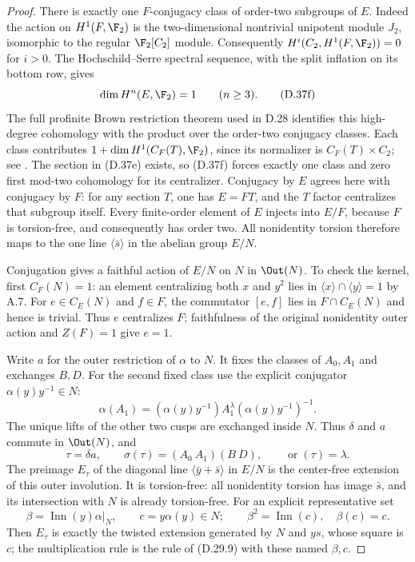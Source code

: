 \begin{proof}
There is exactly one $F$-conjugacy class of order-two subgroups
of $E$.  Indeed the action on $H^1(F,\F_2)$ is the two-dimensional
nontrivial unipotent module $J_2$, isomorphic to the regular
$\F_2[C_2]$ module.  Consequently
$H^i(C_2,H^1(F,\F_2))=0$ for $i>0$.
The Hochschild--Serre spectral sequence, with the split
inflation on its bottom row, gives
\[
                 \dim H^n(E,\F_2)=1\qquad(n\geq3).
                                                        \tag{D.37f}
\]
The full profinite Brown restriction theorem used in D.28
identifies this high-degree cohomology with the product over
the order-two conjugacy classes.  Each class contributes
$1+\dim H^1(C_F(T),\F_2)$, since its normalizer is
$C_F(T)\times C_2$; see
\cite[Theorem 2 and \S1.1]{A-KochloukovaZalesskii2007}.
The section in (D.37e) exists, so (D.37f) forces exactly one
class and zero first mod-two cohomology for its centralizer.
Conjugacy by $E$ agrees here with conjugacy by $F$: for any
section $T$, one has $E=FT$, and the $T$ factor centralizes
that subgroup itself.
Every finite-order element of $E$ injects into $E/F$,
because $F$ is torsion-free, and consequently has order two.
All nonidentity torsion therefore maps to the one line
$\langle\bar s\rangle$ in the abelian group $E/N$.

Conjugation gives a faithful action of $E/N$ on $N$ in
$\Out(N)$.  To check the kernel, first
$C_F(N)=1$: an element centralizing both $x$ and $y^2$
lies in $\langle x\rangle\cap\langle y\rangle=1$ by A.7.
For $e\in C_E(N)$ and $f\in F$, the commutator $[e,f]$
lies in $F\cap C_E(N)$ and hence is trivial.  Thus $e$
centralizes $F$; faithfulness of the original nonidentity
outer action and $Z(F)=1$ give $e=1$.

Write $a$ for the outer restriction of $\alpha$ to $N$.
It fixes the classes of $A_0,A_1$ and exchanges $B,D$.
For the second fixed class use the explicit conjugator
$\alpha(y)y^{-1}\in N$:
\[
 \alpha(A_1)
  =(\alpha(y)y^{-1}) A_1^\lambda
                         (\alpha(y)y^{-1})^{-1}.
                                                        \tag{D.37g}
\]
The unique lifts of the other two cusps are exchanged inside
$N$.  Thus $\delta$ and $a$ commute in $\Out(N)$, and
\[
 \tau=\delta a,\qquad
 \sigma(\tau)=(A_0\ A_1)(B\ D),\qquad
 \operatorname{or}(\tau)=\lambda.
                                                        \tag{D.37h}
\]
The preimage $E_\tau$ of the diagonal line
$\langle\bar y+\bar s\rangle$ in $E/N$ is the center-free
extension of this outer involution.  It is torsion-free:
all nonidentity torsion has image $\bar s$, and its
intersection with $N$ is already torsion-free.
For an explicit representative set
\[
 \beta=\operatorname{Inn}(y)\alpha|_N,\qquad
 c=y\alpha(y)\in N;\qquad
 \beta^2=\operatorname{Inn}(c),\quad \beta(c)=c.
                                                        \tag{D.37i}
\]
Then $E_\tau$ is exactly the twisted extension generated by
$N$ and $ys$, whose square is $c$; the multiplication rule
is the rule of (D.29.9) with these named $\beta,c$.


\end{proof}
